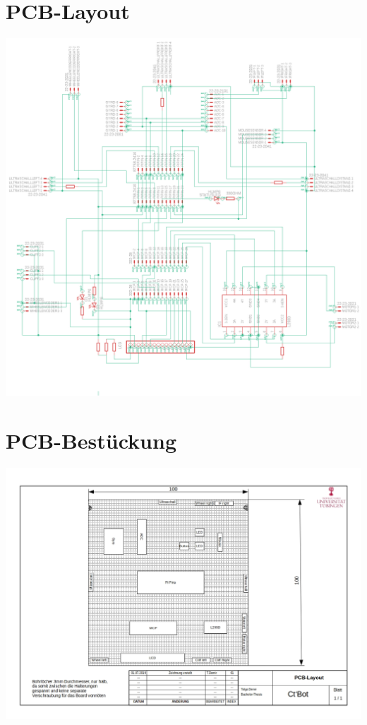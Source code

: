 \documentclass[twoside,11pt, a4paper]{report}
\begin{document}
	\section{PCB-Layout}
	\includegraphics[angle=0,origin=c, scale= 0.7]{images/Layout.png}
	\section{PCB-Bestückung}
	\includegraphics[angle=90,origin=c, scale= 0.7]{images/PCB-Layout.jpg}
	
\end{document}
